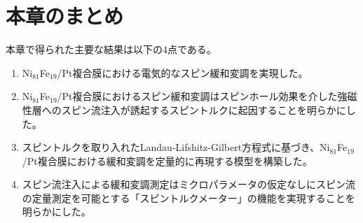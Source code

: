 \section{本章のまとめ}
本章で得られた主要な結果は以下の4点である。
\begin{enumerate}
 \item Ni$_{81}$Fe$_{19}$/Pt複合膜における電気的なスピン緩和変調を実現した。
 \item Ni$_{81}$Fe$_{19}$/Pt複合膜におけるスピン緩和変調はスピンホール効果を介した強磁性層へのスピン流注入が誘起するスピントルクに起因することを明らかにした。
 \item スピントルクを取り入れたLandau-Lifshitz-Gilbert方程式に基づき、Ni$_{81}$Fe$_{19}$/Pt複合膜における緩和変調を定量的に再現する模型を構築した。
 \item スピン流注入による緩和変調測定はミクロパラメータの仮定なしにスピン流の定量測定を可能とする「スピントルクメーター」の機能を実現することを明らかにした。
\end{enumerate}









